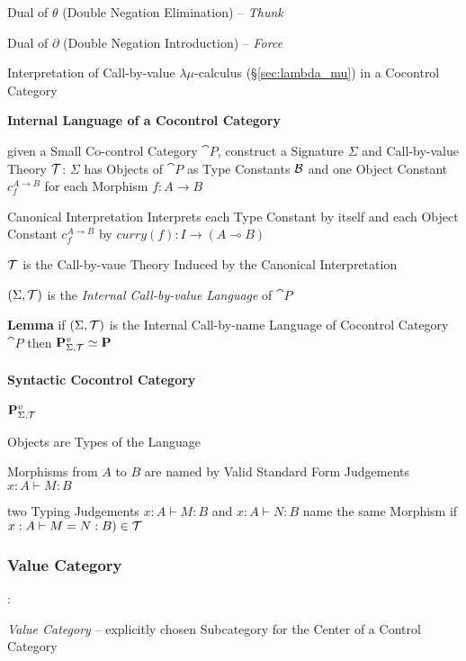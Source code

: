 
Dual of $\theta$ (Double Negation Elimination) -- \emph{Thunk}

Dual of $\partial$ (Double Negation Introduction) -- \emph{Force}


\asterism


Interpretation of Call-by-value $\lambda\mu$-calculus
(\S\ref{sec:lambda_mu}) in a Cocontrol Category


\textbf{Internal Language of a Cocontrol Category}

given a Small Co-control Category $\cat{P}$, construct a Signature
$\Sigma$ and Call-by-value Theory $\mathcal{T}$: $\Sigma$ has Objects of
$\cat{P}$ as Type Constants $\mathcal{B}$ and one Object Constant
$c_f^{A \rightarrow B}$ for each Morphism $f : A \rightarrow B$

Canonical Interpretation Interprets each Type Constant by itself and
each Object Constant $c_f^{A \rightarrow B}$ by $curry(f): I
\rightarrow (A \multimap B)$

$\mathcal{T}$ is the Call-by-vaue Theory Induced by the Canonical
Interpretation

$(\Sigma,\mathcal{T})$ is the \emph{Internal Call-by-value Language} of
$\cat{P}$

\textbf{Lemma} if $(\Sigma,\mathcal{T})$ is the Internal Call-by-name
Language of Cocontrol Category $\cat{P}$ then
$\mathbf{P}^v_{\Sigma,\mathcal{T}} \simeq \mathbf{P}$


\paragraph{Syntactic Cocontrol Category}
\label{sec:syntactic_cocontrol_category}\hfill

$\mathbf{P}^v_{\Sigma,\mathcal{T}}$

Objects are Types of the Language

Morphisms from $A$ to $B$ are named by Valid Standard Form Judgements
$x:A \vdash M:B$

two Typing Judgements $x:A \vdash M:B$ and $x:A \vdash N:B$ name the
same Morphism if $x:A \vdash M = N:B) \in \mathcal{T}$



\subsubsection{Value Category}\label{sec:value_category}

\cite{selinger01}:

\emph{Value Category} -- explicitly chosen Subcategory for the Center
of a Control Category

